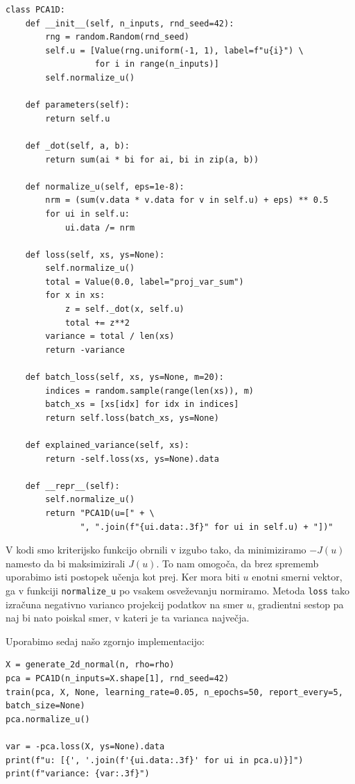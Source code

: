 \vspace*{3mm}
\begin{lstlisting}
class PCA1D:
    def __init__(self, n_inputs, rnd_seed=42):
        rng = random.Random(rnd_seed)
        self.u = [Value(rng.uniform(-1, 1), label=f"u{i}") \
                  for i in range(n_inputs)]
        self.normalize_u()

    def parameters(self):
        return self.u

    def _dot(self, a, b):
        return sum(ai * bi for ai, bi in zip(a, b))

    def normalize_u(self, eps=1e-8):
        nrm = (sum(v.data * v.data for v in self.u) + eps) ** 0.5
        for ui in self.u:
            ui.data /= nrm

    def loss(self, xs, ys=None):
        self.normalize_u()
        total = Value(0.0, label="proj_var_sum")
        for x in xs:
            z = self._dot(x, self.u)
            total += z**2
        variance = total / len(xs)
        return -variance

    def batch_loss(self, xs, ys=None, m=20):
        indices = random.sample(range(len(xs)), m)
        batch_xs = [xs[idx] for idx in indices]
        return self.loss(batch_xs, ys=None)

    def explained_variance(self, xs):
        return -self.loss(xs, ys=None).data

    def __repr__(self):
        self.normalize_u()
        return "PCA1D(u=[" + \
               ", ".join(f"{ui.data:.3f}" for ui in self.u) + "])"
\end{lstlisting}

V kodi smo kriterijsko funkcijo obrnili v izgubo tako, da minimiziramo $-J(u)$ namesto da bi maksimizirali $J(u)$. To nam omogoča, da brez sprememb uporabimo isti postopek učenja kot prej. Ker mora biti $u$ enotni smerni vektor, ga v funkciji \texttt{normalize\_u} po vsakem osveževanju normiramo. Metoda \texttt{loss} tako izračuna negativno varianco projekcij podatkov na smer $u$, gradientni sestop pa naj bi nato poiskal smer, v kateri je ta varianca največja.

Uporabimo sedaj našo zgornjo implementacijo:

\vspace*{3mm}
\begin{lstlisting}
X = generate_2d_normal(n, rho=rho)
pca = PCA1D(n_inputs=X.shape[1], rnd_seed=42)
train(pca, X, None, learning_rate=0.05, n_epochs=50, report_every=5, batch_size=None)
pca.normalize_u()

var = -pca.loss(X, ys=None).data
print(f"u: [{', '.join(f'{ui.data:.3f}' for ui in pca.u)}]")
print(f"variance: {var:.3f}")
\end{lstlisting}

